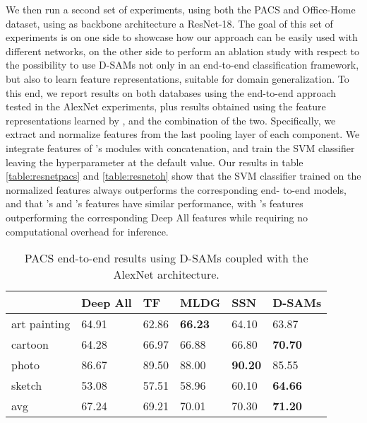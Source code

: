     We then run a second set of experiments, using both the PACS and Office-Home dataset, using as backbone architecture a ResNet-18. The goal of this set of experiments is on one side to showcase how our approach can be easily used with different  networks, on the other side to perform an ablation study with respect to the possibility to use D-SAMs not only in an end-to-end classification framework, but also to learn feature representations, suitable for domain generalization. To this end, we report results on both databases using the end-to-end approach tested in the AlexNet experiments, plus results obtained using the feature representations learned by ,  and the combination of the two. Specifically, we extract and  normalize features from 
the last pooling layer of each component. We integrate features of ’s modules 
with concatenation, and train the SVM classifier leaving the hyperparameter  
at the default value. Our results in table \ref{table:resnetpacs} and \ref{table:resnetoh} show that the SVM classifier 
trained on the  normalized features always outperforms the corresponding end-
 to-end models, and that ’s and ’s features have similar performance, with ’s 
 features outperforming the corresponding Deep All features while requiring no 
 computational overhead for inference. 
   
    
    
    \begin{table}
\centering
\caption{PACS end-to-end results using D-SAMs coupled with the AlexNet architecture.}
\label{table:pacs}
\begin{tabular}{p{2cm}p{2cm}p{2cm}p{2cm}p{2cm}p{2cm}}
\hline
\textbf{}    & Deep All \cite{li2017deeper} & TF \cite{li2017deeper} & MLDG \cite{MLDG_AAA18}           & SSN \cite{mancini2018best}         & D-SAMs           \\
\hline
art painting & 64.91    & 62.86        & \textbf{66.23} & 64.10          & 63.87          \\
cartoon      & 64.28    & 66.97        & 66.88          & 66.80          & \textbf{70.70} \\
photo        & 86.67    & 89.50        & 88.00          & \textbf{90.20} & 85.55          \\
sketch       & 53.08    & 57.51        & 58.96          & 60.10          & \textbf{64.66} \\
\hline
avg          & 67.24    & 69.21        & 70.01          & 70.30          & \textbf{71.20}
\end{tabular}
\end{table}

